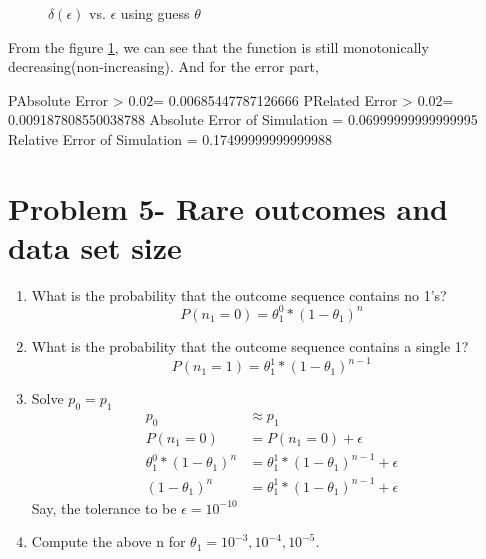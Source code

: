 \documentclass[preprint,12pt]{elsarticle}
\begin{document}
\begin{enumerate}
\begin{figure}[h]
        \caption{$\delta(\epsilon)$ vs. $\epsilon$ using guess $\theta$}
        \label{fig:7}
    \end{figure}
    From the figure \ref{fig:7}, we can see that the function is still
    monotonically decreasing(non-increasing). And for the error part,
    \begin{spverbatim}
    P{Absolute Error > 0.02}= 0.00685447787126666
    P{Related Error > 0.02}= 0.009187808550038788
    Absolute Error of Simulation =  0.06999999999999995
    Relative Error of Simulation =  0.17499999999999988
    \end{spverbatim}
    \end{enumerate}
    
    \section{Problem 5- Rare outcomes and data set size}
    \begin{enumerate}
    \item What is the probability that the outcome sequence contains no 1's?
    \begin{equation*}
        P(n_1 = 0) = \theta_1^0 * (1 - \theta_1)^{n}
    \end{equation*}
    \item What is the probability that the outcome sequence contains a single 1?
    \begin{equation*}
        P(n_1 = 1) = \theta_1^1 * (1 - \theta_1)^{n-1}
    \end{equation*}
    \item Solve $p_0 = p_1$
    \begin{align*}
        p_0                             &\approx p_1 \\
        P(n_1 = 0)                      &= P(n_1 = 0) + \epsilon\\
        \theta_1^0 * (1-\theta_1)^{n}   &= \theta_1^1 * (1-\theta_1)^{n-1} + \epsilon\\
        (1-\theta_1)^{n}                &= \theta_1^1 * (1-\theta_1)^{n-1} + \epsilon
    \end{align*}
    Say, the tolerance to be $\epsilon = 10^{-10}$
    
    \item Compute the above n for $\theta_1 = 10^{-3}, 10^{-4}, 10^{-5}$.
    \end{enumerate}
\end{document}
